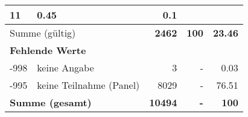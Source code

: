 \begin{longtable}{lXrrr}
       \num{11} &
       \num[round-mode=places,round-precision=2]{0,45} &
         \num[round-mode=places,round-precision=2]{0,1} \\
     \midrule
     \multicolumn{2}{l}{Summe (gültig)} &
       \textbf{\num{2462}} &
     \textbf{100} &
       \textbf{\num[round-mode=places,round-precision=2]{23,46}} \\
     \multicolumn{5}{l}{\textbf{Fehlende Werte}}\\
       -998 &
       keine Angabe &
         \num{3} &
        - &
         \num[round-mode=places,round-precision=2]{0,03} \\
       -995 &
       keine Teilnahme (Panel) &
         \num{8029} &
        - &
         \num[round-mode=places,round-precision=2]{76,51} \\
     \midrule
     \multicolumn{2}{l}{\textbf{Summe (gesamt)}} &
          \textbf{\num{10494}} &
        \textbf{-} &
        \textbf{100} \\
     \bottomrule
     \end{longtable}
     
